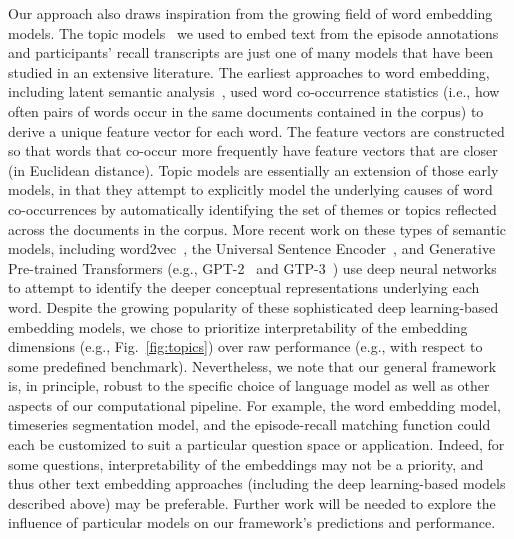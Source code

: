 \documentclass[10pt]{article}
\begin{document}
Our approach also draws inspiration from the growing field of word embedding models.  The topic models~\citep{BleiEtal03} we used to embed text from the episode annotations and participants' recall transcripts are just one of many models that have been studied in an extensive literature.  The earliest approaches to word embedding, including latent
semantic analysis~\citep{LandDuma97}, used word co-occurrence statistics (i.e., how often pairs of words occur in the same documents contained in the corpus) to derive a unique feature vector for each word.  The feature vectors are constructed so that words that co-occur more frequently have feature vectors that are closer (in Euclidean distance).  Topic models are essentially an extension of those early models, in that they attempt to explicitly model the underlying causes of word co-occurrences by automatically identifying the set of themes or topics reflected across the documents in the corpus.  More recent work on these types of semantic models, including word2vec~\citep{MikoEtal13a}, the Universal Sentence Encoder~\citep{CerEtal18}, and Generative Pre-trained Transformers (e.g., GPT-2~\citep{RadfEtal19} and GTP-3~\citep{BrowEtal20}) use deep neural networks to attempt to identify the deeper conceptual representations underlying each word.  Despite the growing popularity of these sophisticated deep learning-based embedding models, we chose to prioritize interpretability of the embedding dimensions (e.g., Fig.~\ref{fig:topics}) over raw performance (e.g., with respect to some predefined benchmark).  Nevertheless, we note that our general framework is, in principle, robust to the specific choice of language model as well as other aspects of our computational pipeline.  For example, the word embedding model, timeseries segmentation model, and the episode-recall matching function could each be customized to suit a particular question space or application.  Indeed, for some questions, interpretability of the embeddings may not be a priority, and thus other text embedding approaches (including the deep learning-based models described above) may be preferable.  Further work will be needed to explore the influence of particular models on our framework's predictions and performance.
\end{document}
